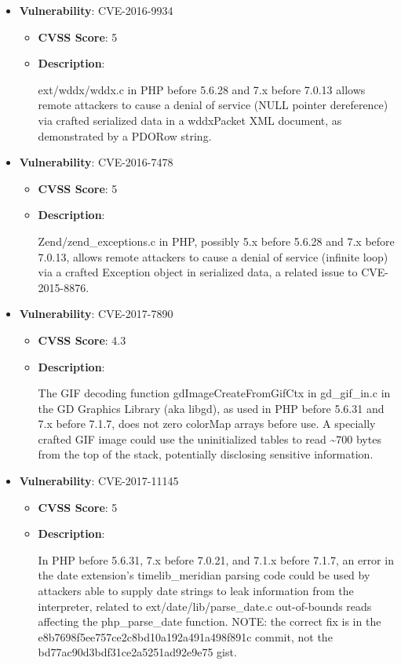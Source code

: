 \documentclass{article}
\begin{document}
\begin{itemize}
        \item \textbf{Vulnerability}: CVE-2016-9934
        \begin{itemize}
            \item \textbf{CVSS Score}:  5 
            \item \textbf{Description}:
            \parbox[t]{0.9\linewidth}{
                \ttfamily ext/wddx/wddx.c in PHP before 5.6.28 and 7.x before 7.0.13 allows remote attackers to cause a denial of service (NULL pointer dereference) via crafted serialized data in a wddxPacket XML document, as demonstrated by a PDORow string.
            }
        \end{itemize}
    
        \item \textbf{Vulnerability}: CVE-2016-7478
        \begin{itemize}
            \item \textbf{CVSS Score}:  5 
            \item \textbf{Description}:
            \parbox[t]{0.9\linewidth}{
                \ttfamily Zend/zend\_exceptions.c in PHP, possibly 5.x before 5.6.28 and 7.x before 7.0.13, allows remote attackers to cause a denial of service (infinite loop) via a crafted Exception object in serialized data, a related issue to CVE-2015-8876.
            }
        \end{itemize}
    
        \item \textbf{Vulnerability}: CVE-2017-7890
        \begin{itemize}
            \item \textbf{CVSS Score}:  4.3 
            \item \textbf{Description}:
            \parbox[t]{0.9\linewidth}{
                \ttfamily The GIF decoding function gdImageCreateFromGifCtx in gd\_gif\_in.c in the GD Graphics Library (aka libgd), as used in PHP before 5.6.31 and 7.x before 7.1.7, does not zero colorMap arrays before use. A specially crafted GIF image could use the uninitialized tables to read \~{}700 bytes from the top of the stack, potentially disclosing sensitive information.
            }
        \end{itemize}
    
        \item \textbf{Vulnerability}: CVE-2017-11145
        \begin{itemize}
            \item \textbf{CVSS Score}:  5 
            \item \textbf{Description}:
            \parbox[t]{0.9\linewidth}{
                \ttfamily In PHP before 5.6.31, 7.x before 7.0.21, and 7.1.x before 7.1.7, an error in the date extension's timelib\_meridian parsing code could be used by attackers able to supply date strings to leak information from the interpreter, related to ext/date/lib/parse\_date.c out-of-bounds reads affecting the php\_parse\_date function. NOTE: the correct fix is in the e8b7698f5ee757ce2c8bd10a192a491a498f891c commit, not the bd77ac90d3bdf31ce2a5251ad92e9e75 gist.
            }
        \end{itemize}
    

\end{itemize}
\end{document}
